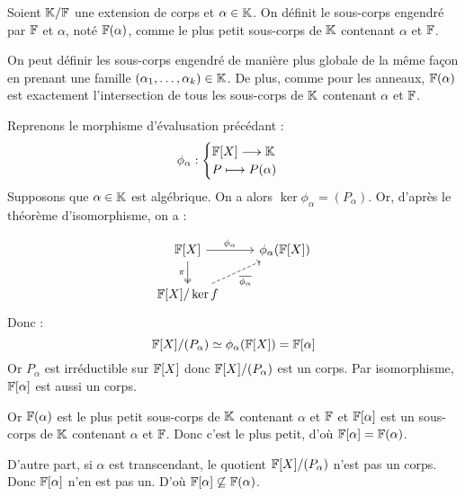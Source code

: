\begin{definition}
    Soient $\mathbb{K}/\mathbb{F}$ une extension de corps et $ \alpha \in \mathbb{K}$. On définit le sous-corps engendré par $\mathbb{F}$ et $ \alpha$, 
    noté $\mathbb{F}( \alpha)$, comme le plus petit sous-corps de $\mathbb{K}$ contenant $ \alpha$ et $\mathbb{F}$. 
\end{definition}

On peut définir les sous-corps engendré de manière plus globale de la même façon en prenant une famille 
$( \alpha_1, \dots, \alpha_k) \in \mathbb{K}$. De plus, comme pour les anneaux, $\mathbb{F}(\alpha)$ est exactement 
l'intersection de tous les sous-corps de $\mathbb{K}$ contenant $\alpha $ et $\mathbb{F}$. 

\begin{proposition}
    Reprenons le morphisme d'évalusation précédant : 
        \[ \phi_\alpha : 
        \begin{cases}
            \mathbb{F}[X] \longrightarrow \mathbb{K} \\ 
            P \longmapsto P( \alpha)
        \end{cases} \]
    Supposons que $\alpha \in \mathbb{K}$ est algébrique. On a alors $ \ker \phi_\alpha = (P_\alpha)$.  
    Or, d'après le théorème d'isomorphisme, on a : 
    \begin{multicols}{2}
        \[
            \begin{tikzcd}
                \Fc[X] \arrow[r, "\phi_\alpha"] \arrow[d, two heads, "\pi"'] & \phi_\alpha(\Fc[X]) \\
                \Fc[X] / \ker f \arrow[ur, dashed, "\overline{\phi_\alpha}"']
            \end{tikzcd}
        \]
        Donc :  
            \[ \mathbb{F}[X] / (P_\alpha) \simeq \phi_\alpha(\mathbb{F}[X]) = \mathbb{F}[\alpha] \]  
        Or $P_\alpha$ est irréductible sur $\mathbb{F}[X]$ donc $ \mathbb{F}[X] / (P_\alpha)$ est un corps. Par isomorphisme, $\mathbb{F}[\alpha]$ 
        est aussi un corps. 
    \end{multicols}

    Or $\mathbb{F}(\alpha)$ est le plus petit sous-corps de $\mathbb{K}$ contenant $\alpha$ et $\mathbb{F}$ et $\mathbb{F}[\alpha]$ est 
    un sous-corps de $\mathbb{K}$ contenant $\alpha$ et $\mathbb{F}$. Donc c'est le plus petit, d'où $ \mathbb{F}[\alpha] =  \mathbb{F}(\alpha) $.  

    D'autre part, si $\alpha$ est transcendant, le quotient $\mathbb{F}[X] / (P_\alpha)$ n'est pas un corps. 
    Donc $\mathbb{F}[\alpha]$ n'en est pas un. D'où $ \mathbb{F}[\alpha] \not \subseteq \mathbb{F}(\alpha)$. 
\end{proposition}

